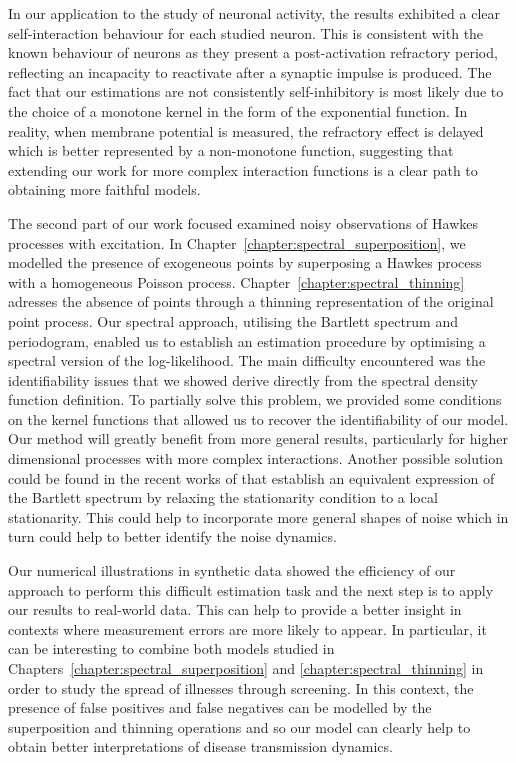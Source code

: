 In our application to the study of neuronal activity, the results exhibited a clear self-interaction behaviour for each studied neuron.
This is consistent with the known behaviour of neurons as they present a post-activation refractory period, reflecting an incapacity to reactivate 
after a synaptic impulse is produced.
The fact that our estimations are not consistently self-inhibitory is most likely due to the choice of a monotone kernel in the form of the exponential function.
In reality, when membrane potential is measured, the refractory effect is delayed which is better represented by a non-monotone function, suggesting that extending our work for more complex interaction functions is a clear path to obtaining more faithful models.

\vspace{5mm}

The second part of our work focused examined noisy observations of Hawkes processes with excitation. 
In Chapter~\ref{chapter:spectral_superposition}, we modelled the presence of exogeneous points by superposing a Hawkes process with a homogeneous Poisson process.
Chapter~\ref{chapter:spectral_thinning} adresses the absence of points through a thinning representation of the original point process.
Our spectral approach, utilising the Bartlett spectrum and periodogram, enabled us to establish an estimation procedure by optimising a spectral version of the log-likelihood.
The main difficulty encountered was the identifiability issues that we showed derive directly from the spectral density function definition.
To partially solve this problem, we provided some conditions on the kernel functions that allowed us to recover the identifiability of our model.
Our method will greatly benefit from more general results, particularly for higher dimensional processes with more complex interactions.
Another possible solution could be found in the recent works of \textcite{Roueff2019} that establish an equivalent expression of the Bartlett spectrum by relaxing the stationarity condition to a local stationarity. 
This could help to incorporate more general shapes of noise which in turn could help to better identify the noise dynamics.

Our numerical illustrations in synthetic data showed the efficiency of our approach to perform this difficult estimation task and the next step is to apply our results to real-world data.
This can help to provide a better insight in contexts where measurement errors are more likely to appear.
In particular, it can be interesting to combine both models studied in Chapters~\ref{chapter:spectral_superposition} and \ref{chapter:spectral_thinning}%
in order to study the spread of illnesses through screening.
In this context, the presence of false positives and false negatives can be modelled by the superposition and thinning operations and so our model can clearly help to obtain better interpretations of disease transmission dynamics.

